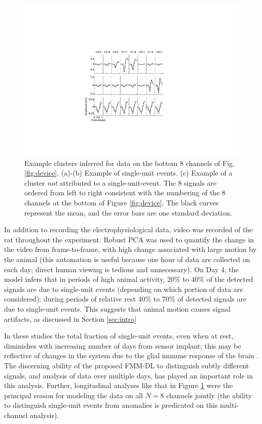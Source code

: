 \documentclass[journal]{IEEEtran}
\begin{document}
\begin{figure}[h!]
  \centering
    \includegraphics[width=1.0\linewidth]{figs_new/singleunits.pdf}
\caption{{{Example
clusters inferred for data on the bottom 8 channels of Fig.
\ref{fig:device}. (a)-(b) Example of single-unit events. (c) Example
of a cluster \emph{not} attributed to a single-unit-event. The 8
signals are ordered from left to right consistent with the numbering
of the 8 channels at the bottom of Figure \ref{fig:device}. The black curves represent the mean, and the error bars are one standard deviation.}}}
\label{fig:units}
\end{figure}
% 
In addition to recording the electrophysiological data, video was recorded of the rat throughout{ the experiment}. Robust PCA \cite{Wright09} was used to quantify the change in the video from frame-to-frame, with high change associated with large motion by the animal (this automation is {useful} because one hour of data are collected on each day; direct human viewing is tedious and unnecessary). On Day 4, the model infers that in periods of high animal activity, 20\% to 40\% of the detected signals are due to single-unit events (depending on which portion of data are considered); during periods of relative rest 40\% to 70\% of detected signals are due to single-unit events. This suggests that animal motion causes signal artifacts, as discussed in Section \ref{sec:intro}


In these studies the total fraction of single-unit events, even when at rest, diminishes with increasing number of days from sensor implant; this may be reflective of changes in the system due to the glial immune response of the brain \cite{Biran,Szarowski03}. The discerning ability of the proposed FMM{-DL} to distinguish subtly different signals, and analysis of data over multiple days, has played an important role in this analysis. Further, {longitudinal} analyses like that in Figure \ref{fig:units} were the principal reason for modeling the data on all $N=8$ channels jointly (the ability to distinguish single-unit events from anomalies is predicated on this multi-channel analysis).
\end{document}

